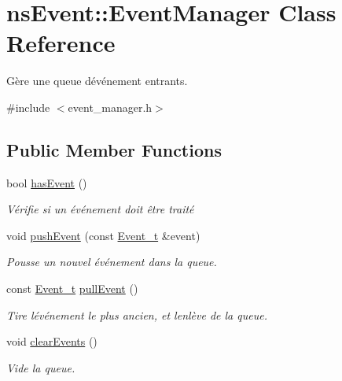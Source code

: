 \hypertarget{classns_event_1_1_event_manager}{}\section{ns\+Event\+:\+:Event\+Manager Class Reference}
\label{classns_event_1_1_event_manager}


Gère une queue d\textquotesingle{}événement entrants.  




{\ttfamily \#include $<$event\+\_\+manager.\+h$>$}

\subsection*{Public Member Functions}
\begin{DoxyCompactItemize}
\item 
bool \hyperlink{classns_event_1_1_event_manager_a5a3119d969a296b8e94f223171fdf2e6}{has\+Event} ()
\begin{DoxyCompactList}\small\item\em Vérifie si un événement doit être traité \end{DoxyCompactList}\item 
void \hyperlink{classns_event_1_1_event_manager_a1eff8398ddb0a25da82e52a1067b85b5}{push\+Event} (const \hyperlink{structns_event_1_1_event__t}{Event\+\_\+t} \&event)
\begin{DoxyCompactList}\small\item\em Pousse un nouvel événement dans la queue. \end{DoxyCompactList}\item 
const \hyperlink{structns_event_1_1_event__t}{Event\+\_\+t} \hyperlink{classns_event_1_1_event_manager_ac37f8ed34ab7c874ff28af7dccc035f3}{pull\+Event} ()
\begin{DoxyCompactList}\small\item\em Tire l\textquotesingle{}événement le plus ancien, et l\textquotesingle{}enlève de la queue. \end{DoxyCompactList}\item 
void \hyperlink{classns_event_1_1_event_manager_adbc5ced9a9435f61f58436ff613632b4}{clear\+Events} ()
\begin{DoxyCompactList}\small\item\em Vide la queue. \end{DoxyCompactList}\end{DoxyCompactItemize}


